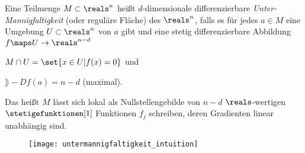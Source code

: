 \begin{definition}\label{untermannigfaltigkeit}
  Eine Teilmenge \( M\subset \reals^n \) heißt \( d \)-dimensionale differenzierbare \emph{Unter-Mannigfaltigkeit} (oder reguläre Fläche) des \( \reals^n \), falls es für jedes \( a\in M \) eine Umgebung \( U\subset \reals^n \) von \( a \) gibt und eine stetig differenzierbare Abbildung \( f\maps U\to \reals^{n-d} \) \sd \begin{eigenschaftenenumerate}
    \item \label{untermannigfaltigkeit:ist_niveaumenge}\( M\cap U=\set{x\in U|f(x)=0} \) und 
    \item \label{untermannigfaltigkeit:maximaler_rang_gibt_dimension} \( \rang-{Df(a)}=n-d \) (maximal).
  \end{eigenschaftenenumerate}
  Das heißt \( M \) lässt sich lokal als Nullstellengebilde von \( n-d \) \( \reals \)-wertigen \( \stetigefunktionen[1] \) Funktionen \( f_j \) schreiben, deren Gradienten linear unabhängig sind.
  \begin{figure}[H]
    \centering
    \texttt{[image: untermannigfaltigkeit\_intuition]}
    \label{fig:untermannigfaltigkeit_intuition}
  \end{figure}
\end{definition}
